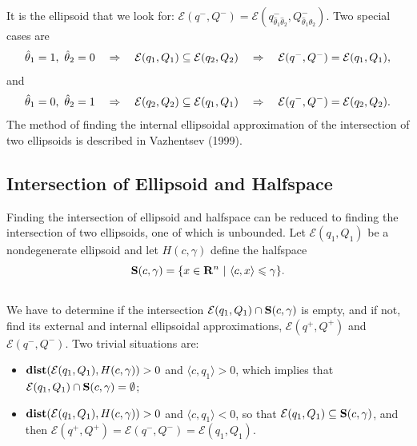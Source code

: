\documentclass[letterpaper,10pt,english]{sphinxmanual}
\begin{document}
It is the ellipsoid that we look for:
${\mathcal E}(q^-,Q^-)={\mathcal E}(q^-_{\hat{\theta}_1\hat{\theta}_2},Q^-_{\hat{\theta}_1\hat{\theta}_2})$.
Two special cases are
\begin{gather}
\begin{split}\hat{\theta}_1=1, ~ \hat{\theta}_2=0 ~~~ \Rightarrow ~~~
{\mathcal E}(q_1,Q_1)\subseteq{\mathcal E}(q_2,Q_2) ~~~ \Rightarrow ~~~
{\mathcal E}(q^-,Q^-)={\mathcal E}(q_1,Q_1),\end{split}\notag
\end{gather}
and
\begin{gather}
\begin{split}\hat{\theta}_1=0, ~ \hat{\theta}_2=1 ~~~ \Rightarrow ~~~
{\mathcal E}(q_2,Q_2)\subseteq{\mathcal E}(q_1,Q_1) ~~~ \Rightarrow ~~~
{\mathcal E}(q^-,Q^-)={\mathcal E}(q_2,Q_2).\end{split}\notag
\end{gather}
The method of finding the internal ellipsoidal approximation of the
intersection of two ellipsoids is described in Vazhentsev (1999).


\subsection{Intersection of Ellipsoid and Halfspace}
\label{chap_ellcalc:intersection-of-ellipsoid-and-halfspace}
Finding the intersection of ellipsoid and halfspace can be reduced to
finding the intersection of two ellipsoids, one of which is unbounded.
Let ${\mathcal E}(q_1,Q_1)$ be a nondegenerate ellipsoid and let
$H(c,\gamma)$ define the halfspace
\begin{gather}
\begin{split}{\bf S}(c,\gamma) = \{x\in{\bf R}^n ~|~ \langle c,x\rangle\leqslant\gamma\}.\end{split}\notag\\\begin{split}\end{split}\notag
\end{gather}
We have to determine if the intersection
${\mathcal E}(q_1,Q_1)\cap{\bf S}(c,\gamma)$ is empty, and if not,
find its external and internal ellipsoidal approximations,
${\mathcal E}(q^+,Q^+)$ and ${\mathcal E}(q^-,Q^-)$. Two
trivial situations are:
\begin{itemize}
\item {} 
${\bf dist}({\mathcal E}(q_1,Q_1),H(c,\gamma))>0$ and
$\langle c, q_1\rangle>0$, which implies that
${\mathcal E}(q_1,Q_1)\cap{\bf S}(c,\gamma)=\emptyset$;

\item {} 
${\bf dist}({\mathcal E}(q_1,Q_1),H(c,\gamma))>0$ and
$\langle c, q_1\rangle<0$, so that
${\mathcal E}(q_1,Q_1)\subseteq{\bf S}(c,\gamma)$, and then
${\mathcal E}(q^+,Q^+)={\mathcal E}(q^-,Q^-)={\mathcal E}(q_1,Q_1)$.

\end{itemize}
\end{document}
